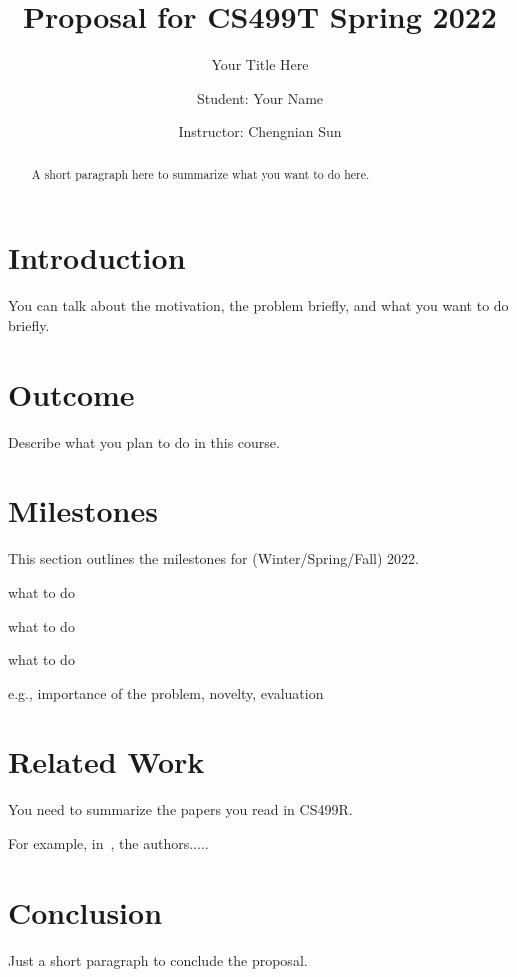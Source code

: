 \documentclass[sigplan,screen]{acmart}
\begin{document}
\title{Proposal for CS499T Spring 2022}
\subtitle{Your Title Here}


\author{Student: Your Name }


\author{Instructor: Chengnian Sun}


\begin{abstract}
    A short paragraph here to summarize what you want to do here.
\end{abstract}


\maketitle



\section{Introduction}
You can talk about the motivation, the problem briefly,
and what you want to do briefly.


\section{Outcome}
Describe what you plan to do in this course.

\section{Milestones}
This section outlines the milestones for (Winter/Spring/Fall) 2022.

\begin{description}[leftmargin=0mm]
\item[Week 1] what to do
\item[Week 2] what to do
\item[Week ...] what to do
\end{description}

e.g., importance of the problem, novelty, evaluation

\section{Related Work}
You need to summarize the papers you read in CS499R.

For example, in~\cite{tkfuzz}, the authors.....


\section{Conclusion}
Just a short paragraph to conclude the proposal.



\end{document}
